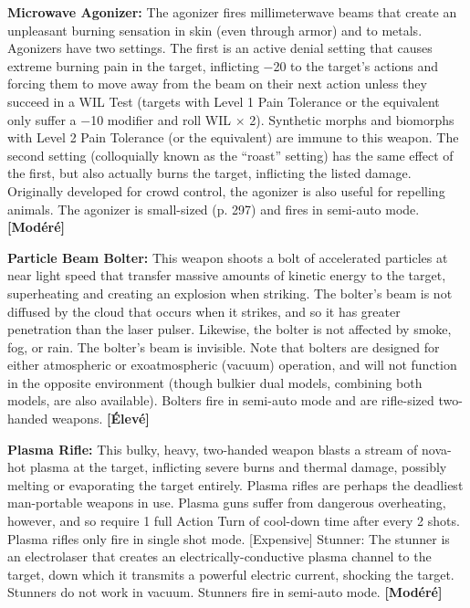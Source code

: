 {{\textbf{Microwave Agonizer:} The agonizer fires millimeterwave beams that create an unpleasant burning sensation in skin (even through armor) and to metals. Agonizers have two settings. The first is an active denial setting that causes extreme burning pain in the target, inflicting $-$20 to the target’s actions and forcing them to move away from the beam on their next action unless they succeed in a WIL Test (targets with Level 1 Pain Tolerance or the equivalent only suffer a $-$10 modifier and roll WIL $\times$ 2). Synthetic morphs and biomorphs with Level 2 Pain Tolerance (or the equivalent) are immune to this weapon. The second setting (colloquially known as the ``roast'' setting) has the same effect of the first, but also actually burns the target, inflicting the listed damage. Originally developed for crowd control, the agonizer is also useful for repelling animals. The agonizer is small-sized (p. 297) and fires in semi-auto mode. \textbf{[Modéré]} 

\textbf{Particle Beam Bolter:} This weapon shoots a bolt of accelerated particles at near light speed that transfer massive amounts of kinetic energy to the target, superheating and creating an explosion when striking. The bolter’s beam is not diffused by the cloud that occurs when it strikes, and so it has greater penetration than the laser pulser. Likewise, the bolter is not affected by smoke, fog, or rain. The bolter’s beam is invisible. Note that bolters are designed for either atmospheric or exoatmospheric (vacuum) operation, and will not function in the opposite environment (though bulkier dual models, combining both models, are also available). Bolters fire in semi-auto mode and are rifle-sized two-handed weapons. \textbf{[Élevé]} 

\textbf{Plasma Rifle:} This bulky, heavy, two-handed weapon blasts a stream of nova-hot plasma at the target, inflicting severe burns and thermal damage, possibly melting or evaporating the target entirely. Plasma rifles are perhaps the deadliest man-portable weapons in use. Plasma guns suffer from dangerous overheating, however, and so require 1 full Action Turn of cool-down time after every 2 shots. Plasma rifles only fire in single shot mode. [Expensive] Stunner: The stunner is an electrolaser that creates an electrically-conductive plasma channel to the target, down which it transmits a powerful electric current, shocking the target. Stunners do not work in vacuum. Stunners fire in semi-auto mode. \textbf{[Modéré]} 

\begin{table} \begin{tabularx}{\textwidth}{|X|X|X|X|l|l|} \hline


\end{tabularx}
\end{table}}}
